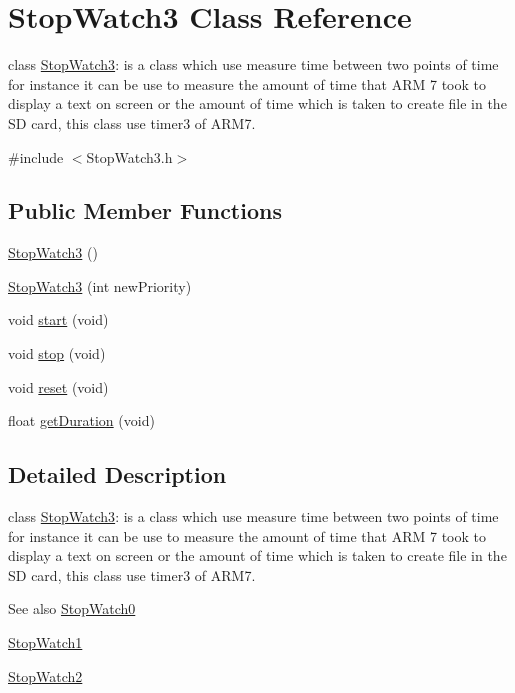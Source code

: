 \hypertarget{class_stop_watch3}{
\section{StopWatch3 Class Reference}
\label{class_stop_watch3}
}


class \hyperlink{class_stop_watch3}{StopWatch3}: is a class which use measure time between two points of time for instance it can be use to measure the amount of time that ARM 7 took to display a text on screen or the amount of time which is taken to create file in the SD card, this class use timer3 of ARM7.  




{\ttfamily \#include $<$StopWatch3.h$>$}

\subsection*{Public Member Functions}
\begin{DoxyCompactItemize}
\item 
\hyperlink{class_stop_watch3_a54551daace0becd03230b2591765a562}{StopWatch3} ()
\item 
\hyperlink{class_stop_watch3_a430d629e09f8bf59bb5b95a0c78514de}{StopWatch3} (int newPriority)
\item 
void \hyperlink{class_stop_watch3_a7b4ea089f7de58c1f855880a832f131b}{start} (void)
\item 
void \hyperlink{class_stop_watch3_ae437886d39413ec6b184f94966bd3b0b}{stop} (void)
\item 
void \hyperlink{class_stop_watch3_a10d6059cbbe7155f73d3c9e0af0603b4}{reset} (void)
\item 
float \hyperlink{class_stop_watch3_a909e9c2f1a085ea81c2f3cf2319bb715}{getDuration} (void)
\end{DoxyCompactItemize}


\subsection{Detailed Description}
class \hyperlink{class_stop_watch3}{StopWatch3}: is a class which use measure time between two points of time for instance it can be use to measure the amount of time that ARM 7 took to display a text on screen or the amount of time which is taken to create file in the SD card, this class use timer3 of ARM7. 

\begin{DoxySeeAlso}{See also}
\hyperlink{class_stop_watch0}{StopWatch0} 

\hyperlink{class_stop_watch1}{StopWatch1} 

\hyperlink{class_stop_watch2}{StopWatch2} 
\end{DoxySeeAlso}


